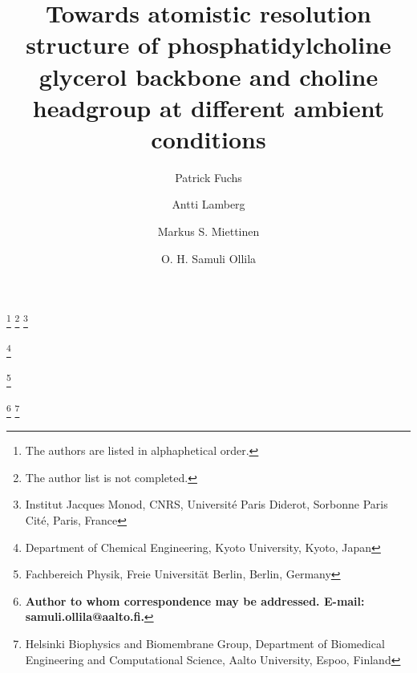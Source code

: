 \documentclass[pre,aps,floatfix,authordate1-4,twocolumn]{revtex4-1}
\begin{document}

\title{Towards atomistic resolution structure of phosphatidylcholine glycerol backbone and choline headgroup at different ambient conditions}

%
\author{Patrick Fuchs}
\thanks{The authors are listed in alphaphetical order.}
\thanks{The author list is not completed.}
\thanks{Institut Jacques Monod, CNRS, Université Paris Diderot, Sorbonne Paris Cité, Paris, France}
\author{Antti Lamberg}
\thanks{Department of Chemical Engineering, Kyoto University, Kyoto, Japan}
\author{Markus S. Miettinen}
\thanks{Fachbereich Physik, Freie Universität Berlin, Berlin, Germany}
\author{O. H. Samuli Ollila} 
\thanks{{\bf Author to whom correspondence may be addressed. E-mail: samuli.ollila@aalto.fi.}}
\thanks{Helsinki Biophysics and Biomembrane Group, Department of Biomedical Engineering and Computational Science, Aalto University, Espoo, Finland}
\end{document}
